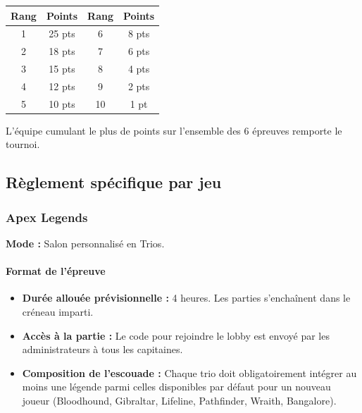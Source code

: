 \documentclass[11pt,a4paper]{article}
\begin{document}
    \begin{center}
        \begin{tabular}{|c|c||c|c|}
            \hline
            \textbf{Rang} & \textbf{Points} & \textbf{Rang} & \textbf{Points} \\
            \hline
            1\ier{}       & 25 pts          & 6\ieme{}      & 8 pts           \\
            2\ieme{}      & 18 pts          & 7\ieme{}      & 6 pts           \\
            3\ieme{}      & 15 pts          & 8\ieme{}      & 4 pts           \\
            4\ieme{}      & 12 pts          & 9\ieme{}      & 2 pts           \\
            5\ieme{}      & 10 pts          & 10\ieme{}     & 1 pt            \\
            \hline
        \end{tabular}
    \end{center}
    L'équipe cumulant le plus de points sur l'ensemble des 6 épreuves remporte le tournoi.

    \subsection{Règlement spécifique par jeu}

    \subsubsection{Apex Legends}
    \textbf{Mode :} Salon personnalisé en Trios.

    \paragraph{Format de l'épreuve}
    \begin{itemize}
        \item \textbf{Durée allouée prévisionnelle :} 4 heures.
        Les parties s'enchaînent dans le créneau imparti.
        \item \textbf{Accès à la partie :} Le code pour rejoindre le lobby est envoyé par les administrateurs à tous les capitaines.
        \item \textbf{Composition de l'escouade :} Chaque trio doit obligatoirement intégrer au moins une légende parmi celles disponibles par défaut pour un nouveau joueur (Bloodhound, Gibraltar, Lifeline, Pathfinder, Wraith, Bangalore).
    \end{itemize}
\end{document}
